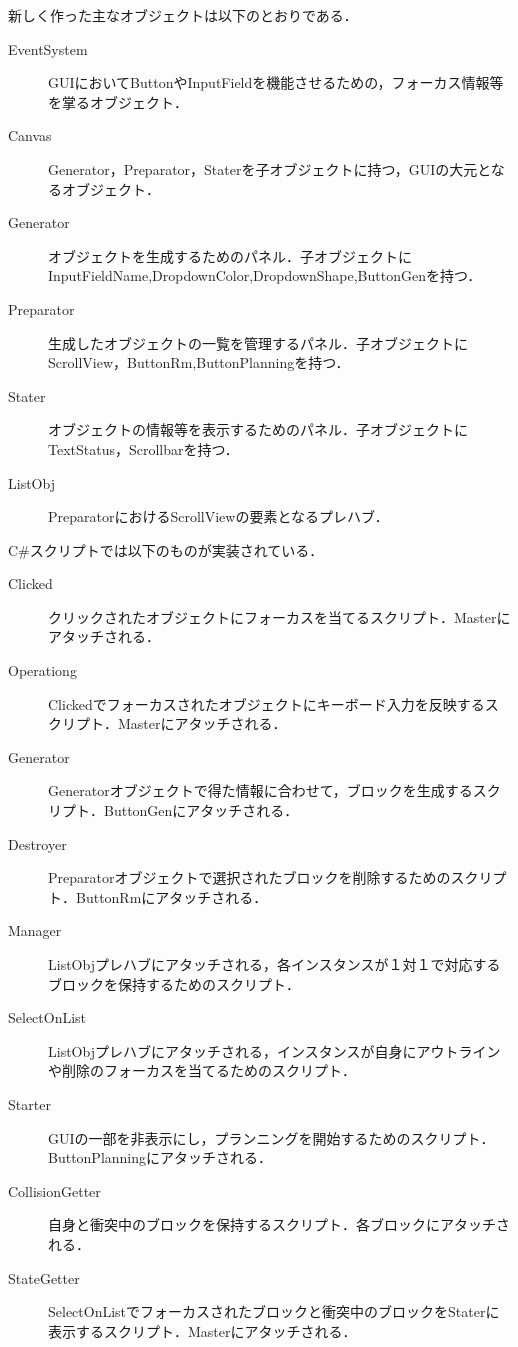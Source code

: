 \documentclass[12pt]{jarticle}
\begin{document}
新しく作った主なオブジェクトは以下のとおりである．
\begin{description}
\item[EventSystem] GUIにおいてButtonやInputFieldを機能させるための，フォーカス情報等を掌るオブジェクト．
\item[Canvas] Generator，Preparator，Staterを子オブジェクトに持つ，GUIの大元となるオブジェクト．
\item[Generator] オブジェクトを生成するためのパネル．子オブジェクトにInputFieldName,DropdownColor,DropdownShape,ButtonGenを持つ．
\item[Preparator] 生成したオブジェクトの一覧を管理するパネル．子オブジェクトにScrollView，ButtonRm,ButtonPlanningを持つ．
\item[Stater] オブジェクトの情報等を表示するためのパネル．子オブジェクトにTextStatus，Scrollbarを持つ．
\item[ListObj] PreparatorにおけるScrollViewの要素となるプレハブ．
\end{description} 

C\#スクリプトでは以下のものが実装されている．
\begin{description}
\item[Clicked] クリックされたオブジェクトにフォーカスを当てるスクリプト．Masterにアタッチされる．
\item[Operationg] Clickedでフォーカスされたオブジェクトにキーボード入力を反映するスクリプト．Masterにアタッチされる．
\item[Generator] Generatorオブジェクトで得た情報に合わせて，ブロックを生成するスクリプト．ButtonGenにアタッチされる．
\item[Destroyer] Preparatorオブジェクトで選択されたブロックを削除するためのスクリプト．ButtonRmにアタッチされる．
\item[Manager] ListObjプレハブにアタッチされる，各インスタンスが１対１で対応するブロックを保持するためのスクリプト．
\item[SelectOnList] ListObjプレハブにアタッチされる，インスタンスが自身にアウトラインや削除のフォーカスを当てるためのスクリプト．
\item[Starter] GUIの一部を非表示にし，プランニングを開始するためのスクリプト．ButtonPlanningにアタッチされる．
\item[CollisionGetter] 自身と衝突中のブロックを保持するスクリプト．各ブロックにアタッチされる．
\item[StateGetter] SelectOnListでフォーカスされたブロックと衝突中のブロックをStaterに表示するスクリプト．Masterにアタッチされる．
\end{description}
\end{document}
